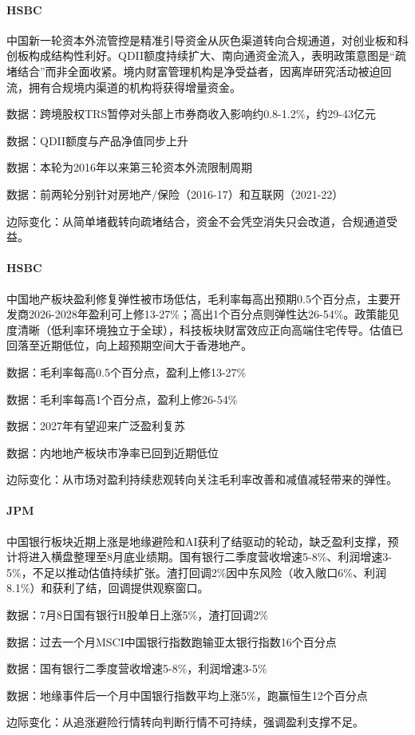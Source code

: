 \documentclass[11pt]{ctexart}
\begin{document}
\paragraph{HSBC} 中国新一轮资本外流管控是精准引导资金从灰色渠道转向合规通道，对创业板和科创板构成结构性利好。QDII额度持续扩大、南向通资金流入，表明政策意图是“疏堵结合”而非全面收紧。境内财富管理机构是净受益者，因离岸研究活动被迫回流，拥有合规境内渠道的机构将获得增量资金。
{\small\color{refgray}数据：跨境股权TRS暂停对头部上市券商收入影响约0.8-1.2\%，约29-43亿元\par}
{\small\color{refgray}数据：QDII额度与产品净值同步上升\par}
{\small\color{refgray}数据：本轮为2016年以来第三轮资本外流限制周期\par}
{\small\color{refgray}数据：前两轮分别针对房地产/保险（2016-17）和互联网（2021-22）\par}
{\small\color{refgray}边际变化：从简单堵截转向疏堵结合，资金不会凭空消失只会改道，合规通道受益。\par}
\paragraph{HSBC} 中国地产板块盈利修复弹性被市场低估，毛利率每高出预期0.5个百分点，主要开发商2026-2028年盈利可上修13-27\%；高出1个百分点则弹性达26-54\%。政策能见度清晰（低利率环境独立于全球），科技板块财富效应正向高端住宅传导。估值已回落至近期低位，向上超预期空间大于香港地产。
{\small\color{refgray}数据：毛利率每高0.5个百分点，盈利上修13-27\%\par}
{\small\color{refgray}数据：毛利率每高1个百分点，盈利上修26-54\%\par}
{\small\color{refgray}数据：2027年有望迎来广泛盈利复苏\par}
{\small\color{refgray}数据：内地地产板块市净率已回到近期低位\par}
{\small\color{refgray}边际变化：从市场对盈利持续悲观转向关注毛利率改善和减值减轻带来的弹性。\par}
\paragraph{JPM} 中国银行板块近期上涨是地缘避险和AI获利了结驱动的轮动，缺乏盈利支撑，预计将进入横盘整理至8月底业绩期。国有银行二季度营收增速5-8\%、利润增速3-5\%，不足以推动估值持续扩张。渣打回调2\%因中东风险（收入敞口6\%、利润8.1\%）和获利了结，回调提供观察窗口。
{\small\color{refgray}数据：7月8日国有银行H股单日上涨5\%，渣打回调2\%\par}
{\small\color{refgray}数据：过去一个月MSCI中国银行指数跑输亚太银行指数16个百分点\par}
{\small\color{refgray}数据：国有银行二季度营收增速5-8\%，利润增速3-5\%\par}
{\small\color{refgray}数据：地缘事件后一个月中国银行指数平均上涨5\%，跑赢恒生12个百分点\par}
{\small\color{refgray}边际变化：从追涨避险行情转向判断行情不可持续，强调盈利支撑不足。\par}
\end{document}

